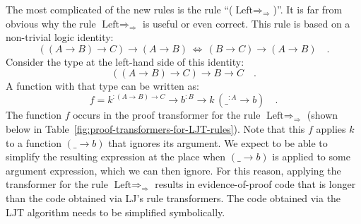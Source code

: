The most complicated of the new rules is the rule \textsf{``}($\text{Left}\Rightarrow_{\Rightarrow}$)\textsf{''}.
It is far from obvious why the rule $\text{Left}\Rightarrow_{\Rightarrow}$
is useful or even correct. This rule is based on a non-trivial logic
identity: 
\[
\left(\left(A\rightarrow B\right)\rightarrow C\right)\rightarrow\left(A\rightarrow B\right)\,\Longleftrightarrow\,\left(B\rightarrow C\right)\rightarrow\left(A\rightarrow B\right)\quad.
\]
Consider the type at the left-hand side of this identity:
\[
\left(\left(A\rightarrow B\right)\rightarrow C\right)\rightarrow B\rightarrow C\quad.
\]
A function with that type can be written as: 
\[
f=k^{:\left(A\rightarrow B\right)\rightarrow C}\rightarrow b^{:B}\rightarrow k\,(\_^{:A}\rightarrow b)\quad.
\]
The function $f$ occurs in the proof transformer for the rule $\text{Left}\Rightarrow_{\Rightarrow}$
(shown below in Table~\ref{fig:proof-transformers-for-LJT-rules}).
Note that this $f$ applies $k$ to a function $(\_\rightarrow b)$
that ignores its argument. We expect to be able to simplify the resulting
expression at the place when $(\_\rightarrow b)$ is applied to some
argument expression, which we can then ignore. For this reason, applying
the transformer for the rule $\text{Left}\Rightarrow_{\Rightarrow}$
results in evidence-of-proof code that is longer than the code obtained
via LJ\textsf{'}s rule transformers. The code obtained via the LJT algorithm
needs to be simplified symbolically.

